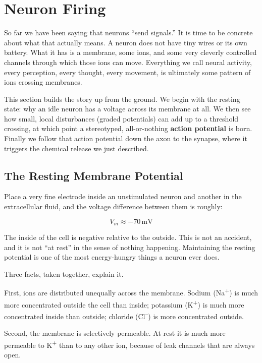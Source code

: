 \documentclass[11pt]{article}
\begin{document}
\section{Neuron Firing}

So far we have been saying that neurons ``send signals.'' It is time to be concrete about what that actually means. A neuron does not have tiny wires or its own battery. What it has is a membrane, some ions, and some very cleverly controlled channels through which those ions can move. Everything we call neural activity, every perception, every thought, every movement, is ultimately some pattern of ions crossing membranes.

This section builds the story up from the ground. We begin with the resting state: why an idle neuron has a voltage across its membrane at all. We then see how small, local disturbances (graded potentials) can add up to a threshold crossing, at which point a stereotyped, all-or-nothing \textbf{action potential} is born. Finally we follow that action potential down the axon to the synapse, where it triggers the chemical release we just described.

\subsection{The Resting Membrane Potential}

Place a very fine electrode inside an unstimulated neuron and another in the extracellular fluid, and the voltage difference between them is roughly:

\[
V_m \approx -70 \, \text{mV}
\]

The inside of the cell is negative relative to the outside. This is not an accident, and it is not ``at rest'' in the sense of nothing happening. Maintaining the resting potential is one of the most energy-hungry things a neuron ever does.

Three facts, taken together, explain it.

First, ions are distributed unequally across the membrane. Sodium (Na\textsuperscript{+}) is much more concentrated outside the cell than inside; potassium (K\textsuperscript{+}) is much more concentrated inside than outside; chloride (Cl\textsuperscript{--}) is more concentrated outside.

Second, the membrane is selectively permeable. At rest it is much more permeable to K\textsuperscript{+} than to any other ion, because of leak channels that are always open.
\end{document}

